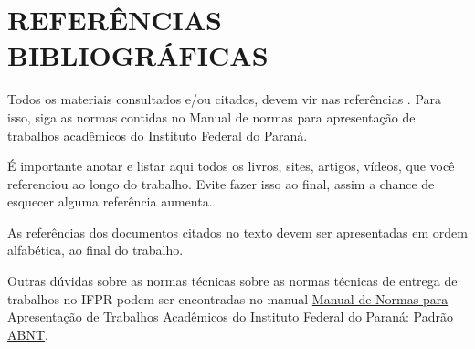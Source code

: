 \documentclass[12pt, openright, oneside, a4paper, english, brazilian]{abntex2}
\begin{document}








\tableofcontents*
\cleardoublepage

\textual







	


\chapter{REFERÊNCIAS BIBLIOGRÁFICAS}
\label{referencias-bibliograficas}
	Todos os materiais consultados e/ou citados, devem vir nas referências . Para isso, siga as normas contidas no Manual de normas para apresentação de trabalhos acadêmicos do Instituto Federal do Paraná.

	É importante anotar e listar aqui todos os livros, sites, artigos, vídeos, que você referenciou ao longo do trabalho. Evite fazer isso ao final, assim a chance de esquecer alguma referência aumenta.

	As referências dos documentos citados no texto devem ser apresentadas em ordem alfabética, ao final do trabalho.

    Outras dúvidas sobre as normas técnicas sobre as normas técnicas de entrega de trabalhos no IFPR podem ser encontradas no manual \href{https://editora.ifpr.edu.br/index.php/aeditora/catalog/book/72}{Manual de Normas para Apresentação de Trabalhos Acadêmicos do Instituto Federal do Paraná: Padrão ABNT}.
\end{document}
